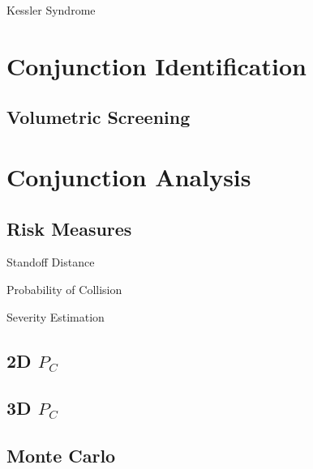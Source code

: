 \documentclass[pdf]{beamer}
\begin{document}
\begin{frame}{Kessler Syndrome}
\end{frame}

\section{Conjunction Identification}
\subsection{Volumetric Screening}

\section{Conjunction Analysis}
\subsection{Risk Measures}

\begin{frame}{Standoff Distance}
\end{frame}

\begin{frame}{Probability of Collision}
\end{frame}

\begin{frame}{Severity Estimation}
\end{frame}

\subsection{2D $P_C$}

\subsection{3D $P_C$}

\subsection{Monte Carlo}
\end{document}

